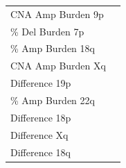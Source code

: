 \begin{table}[!ht]
\begin{minipage}{.49\linewidth}
\begin{tabular}[t]{l>{}r}
CNA Amp Burden 9p & \cellcolor[HTML]{443B84}{\textcolor{white}{16.83}}\\
 
\% Del Burden 7p & \cellcolor[HTML]{481C6E}{\textcolor{white}{45.26}}\\
 
\% Amp Burden 18q & \cellcolor[HTML]{460B5E}{\textcolor{white}{65.25}}\\
 
CNA Amp Burden Xq & \cellcolor[HTML]{46075B}{\textcolor{white}{67.35}}\\
 
Difference 19p & \cellcolor[HTML]{46065A}{\textcolor{white}{70.39}}\\
 
\% Amp Burden 22q & \cellcolor[HTML]{450457}{\textcolor{white}{72.01}}\\
 
Difference 18p & \cellcolor[HTML]{450357}{\textcolor{white}{76.29}}\\
 
Difference Xq & \cellcolor[HTML]{440154}{\textcolor{white}{77.29}}\\
 
Difference 18q & \cellcolor[HTML]{440154}{\textcolor{white}{79.68}}\\
\bottomrule
\end{tabular} \label{table:CNABurdenT2}
    \end{minipage}
\end{table}


